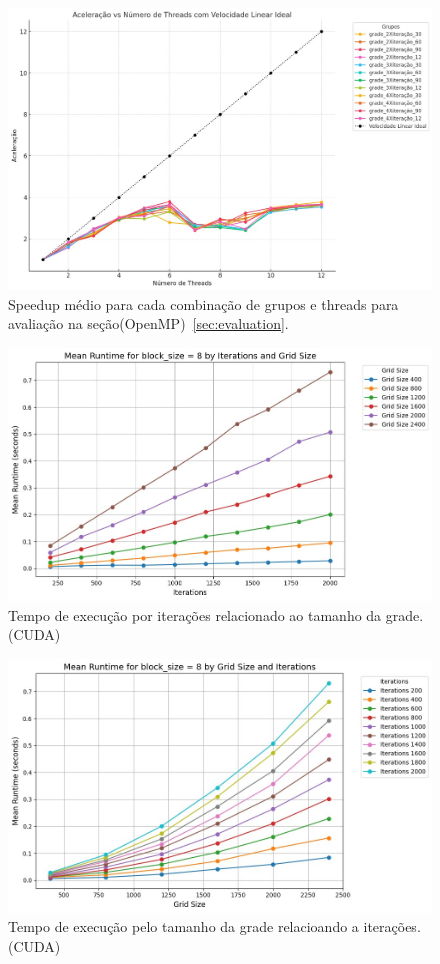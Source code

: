 \begin{figure}[H]
    \centering
    \includegraphics[width=.95\textwidth]{assets/speedup table.jpg}
    \caption{Speedup médio para cada combinação de grupos e threads para avaliação na seção(OpenMP)~\ref{sec:evaluation}.}
    \label{fig:speedup}
\end{figure}
\begin{figure}[H]
    \centering
    \includegraphics[width=.95\linewidth]{assets/MeanRun_Ite_CUDA.jpg}
    \caption{Tempo de execução por iterações relacionado ao tamanho da grade.(CUDA)}
    \label{fig:RuntimexIte}
\end{figure}
\begin{figure}[H]
    \centering
    \includegraphics[width=.95\linewidth]{assets/MeanRun_Grid_CUDA.jpg}
    \caption{Tempo de execução pelo tamanho da grade relacioando a iterações.(CUDA)}
    \label{fig:runtimexgrid}
\end{figure}

